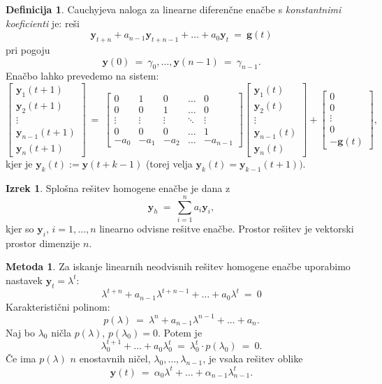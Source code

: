 \documentclass[11pt]{article}
\newcommand{\g}{\mathbf{g}}
\newcommand{\y}{\mathbf{y}}
\theoremstyle{definition}
\newtheorem{definicija}{Definicija}[section]
\theoremstyle{definition}
\theoremstyle{definition}
\newtheorem{izrek}{Izrek}[section]
\theoremstyle{definition}
\newtheorem{metoda}{Metoda}[section]
\begin{document}
\begin{definicija}

Cauchyjeva naloga za linearne diferenčne enačbe s \textit{konstantnimi koeficienti} je: reši
$$\y_{t+n} + a_{n-1}\y_{t+n-1} + \ldots + a_0\y_t ~=~ \g(t)$$
pri pogoju
$$\y(0) ~=~ \gamma_0,\ldots,\y(n-1) ~=~ \gamma_{n-1}.$$
Enačbo lahko prevedemo na sistem:
$$\begin{bmatrix}
\y_1(t+1) \\
\y_2(t+1) \\
\vdots \\
\y_{n-1}(t+1) \\
\y_{n}(t+1)
\end{bmatrix} ~=~ \begin{bmatrix}
0 & 1 & 0 & \ldots & 0 \\
0 & 0 & 1 & \ldots & 0 \\
\vdots & \vdots & \vdots & \ddots & \vdots \\
0 & 0 & 0 & \ldots & 1 \\
-a_0 & -a_1 & -a_2 & \ldots & -a_{n-1} 
\end{bmatrix} \begin{bmatrix}
\y_1(t) \\
\y_2(t) \\
\vdots \\
\y_{n-1}(t) \\
\y_n(t)
\end{bmatrix} + \begin{bmatrix}
0 \\
0 \\
\vdots \\
0 \\
-\g(t)
\end{bmatrix},$$
kjer je $\y_k(t) := \y(t+k-1)$ (torej velja $\y_k(t) = \y_{k-1}(t+1))$.

\end{definicija}
\vspace{0.5cm}

\begin{izrek}

Splošna rešitev homogene enačbe je dana z
$$\y_h ~=~ \sum_{i=1}^n a_i \y_i,$$
kjer so $\y_i$, $i=1,\ldots,n$ linearno odvisne rešitve enačbe. Prostor rešitev je vektorski prostor dimenzije $n.$

\end{izrek}
\vspace{0.5cm}

\begin{metoda}

Za iskanje linearnih neodvisnih rešitev homogene enačbe uporabimo nastavek $\y_t = \lambda^t$:
$$\lambda^{t+n} + a_{n-1}\lambda^{t+n-1} + \ldots + a_0\lambda^t ~=~ 0$$
Karakteristični polinom:
$$p(\lambda) ~=~ \lambda^n + a_{n-1}\lambda^{n-1} + \ldots + a_n.$$
Naj bo $\lambda_0$ ničla $p(\lambda)$, $p(\lambda_0) = 0$. Potem je
$$\lambda_0^{t+1} + \ldots + a_0\lambda_0^t ~=~ \lambda_0^t \cdot p(\lambda_0) ~=~ 0.$$
Če ima $p(\lambda)$ $n$ enostavnih ničel, $\lambda_0,\ldots,\lambda_{n-1}$, je vsaka rešitev oblike
$$\y(t) ~=~ \alpha_0\lambda^t + \ldots + \alpha_{n-1}\lambda_{n-1}^t.$$

\end{metoda}
\vspace{0.5cm}
\end{document}
